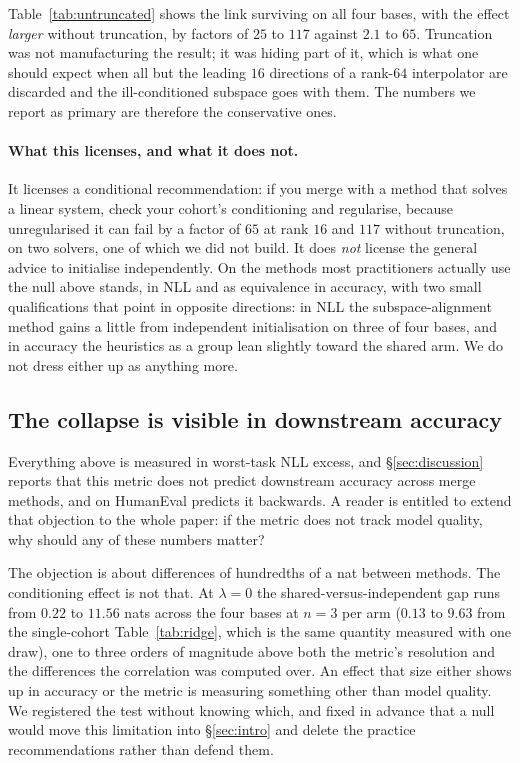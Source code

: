 Table~\ref{tab:untruncated} shows the link surviving on all four bases, with the effect \emph{larger}
without truncation, by factors of $25$ to $117$ against $2.1$ to $65$.
Truncation was not manufacturing the result; it was hiding part of it,
which is what one should expect when all but the leading $16$ directions
of a rank-$64$ interpolator are discarded and the ill-conditioned subspace
goes with them. The numbers we report as primary are therefore the
conservative ones.

\paragraph{What this licenses, and what it does not.} It licenses a
conditional recommendation: if you merge with a method that solves a
linear system, check your cohort's conditioning and regularise, because
unregularised it can fail by a factor of $65$ at rank $16$ and $117$
without truncation, on two solvers, one of which we did not build. It does
\emph{not} license the general advice to initialise independently. On the
methods most practitioners actually use the null above stands, in NLL and
as equivalence in accuracy, with two small qualifications that point in
opposite directions: in NLL the subspace-alignment method gains a little
from independent initialisation on three of four bases, and in accuracy
the heuristics as a group lean slightly toward the shared arm. We do not
dress either up as anything more.

\subsection{The collapse is visible in downstream accuracy}
\label{subsec:downstream-cond}

Everything above is measured in worst-task NLL excess, and
\S\ref{sec:discussion} reports that this metric does not predict downstream
accuracy across merge methods, and on HumanEval predicts it backwards. A
reader is entitled to extend that objection to the whole paper: if the metric
does not track model quality, why should any of these numbers matter?

The objection is about differences of hundredths of a nat between methods. The
conditioning effect is not that. At $\lambda = 0$ the shared-versus-independent
gap runs from $0.22$ to $11.56$ nats across the four bases at $n = 3$ per
arm ($0.13$ to $9.63$ from the single-cohort Table~\ref{tab:ridge}, which is
the same quantity measured with one draw), one to three orders of magnitude above
both the metric's resolution and the differences the correlation was computed
over. An effect that size either shows up in accuracy or the metric is
measuring something other than model quality. We registered the test without
knowing which, and fixed in advance that a null would move this limitation into
\S\ref{sec:intro} and delete the practice recommendations rather than defend
them.

